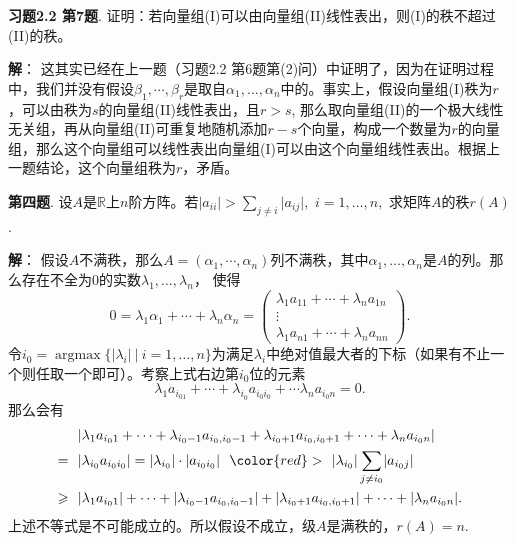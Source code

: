 \fi  %

\newpageorvspace

{\bf 习题2.2 第7题}. 证明：若向量组(I)可以由向量组(II)线性表出，则(I)的秩不超过(II)的秩。

\ifIncludeAnswer

\newpageorvspace

{\bf 解}： 这其实已经在上一题（习题2.2 第6题第(2)问）中证明了，因为在证明过程中，我们并没有假设$\beta_1, \cdots, \beta_r$是取自$\alpha_1, \ldots, \alpha_n$中的。事实上，假设向量组(I)秩为$r$，可以由秩为$s$的向量组(II)线性表出，且$r > s$, 那么取向量组(II)的一个极大线性无关组，再从向量组(II)可重复地随机添加$r-s$个向量，构成一个数量为$r$的向量组，那么这个向量组可以线性表出向量组(I)可以由这个向量组线性表出。根据上一题结论，这个向量组秩为$r$，矛盾。

\fi  %

\newpageorvspace

{\bf 第四题}. 设$A$是$\mathbb{R}$上$n$阶方阵。若$\lvert a_{ii} \rvert > \sum\limits_{j\neq i} \lvert a_{ij} \rvert,$ $i = 1, \ldots, n,$ 求矩阵$A$的秩$r(A)$.

\ifIncludeAnswer

\newpageorvspace

{\bf 解}： 假设$A$不满秩，那么$A = (\alpha_1, \cdots, \alpha_n)$列不满秩，其中$\alpha_1, \ldots, \alpha_n$是$A$的列。那么存在不全为0的实数$\lambda_1, \ldots, \lambda_n$， 使得
$$0 = \lambda_1 \alpha_1 + \cdots + \lambda_n \alpha_n = \begin{pmatrix} \lambda_1 a_{11} + \cdots + \lambda_n a_{1n} \\ \vdots \\ \lambda_1 a_{n1} + \cdots + \lambda_n a_{nn} \end{pmatrix}.$$
令$i_0 = \operatorname{argmax} \{ \lvert \lambda_i \rvert \ |\ i = 1, \ldots, n \}$为满足$\lambda_i$中绝对值最大者的下标（如果有不止一个则任取一个即可）。考察上式右边第$i_0$位的元素
$$\lambda_{1} a_{i_01} + \cdots + \lambda_{i_0} a_{i_0i_0} + \cdots \lambda_n a_{i_0n} = 0.$$
那么会有
\begin{align*}
& ~~ \lvert \lambda_{1} a_{i_01} + \cdots + \lambda_{i_0-1} a_{i_0,i_0-1} + \lambda_{i_0+1} a_{i_0,i_0+1} + \cdots + \lambda_n a_{i_0n} \rvert \\
= & ~~ \lvert \lambda_{i_0} a_{i_0i_0} \rvert = \lvert \lambda_{i_0} \rvert \cdot \lvert a_{i_0i_0} \rvert ~~ {\color{red} >} ~~ \lvert \lambda_{i_0} \rvert \sum\limits_{j\neq i_0} \lvert a_{i_0j} \rvert \\
\geqslant & ~~ \lvert \lambda_{1} a_{i_01} \rvert + \cdots + \lvert \lambda_{i_0-1} a_{i_0,i_0-1} \rvert + \lvert \lambda_{i_0+1} a_{i_0,i_0+1} \rvert + \cdots + \lvert \lambda_n a_{i_0n} \rvert.
\end{align*}
上述不等式是不可能成立的。所以假设不成立，级$A$是满秩的，$r(A) = n.$

